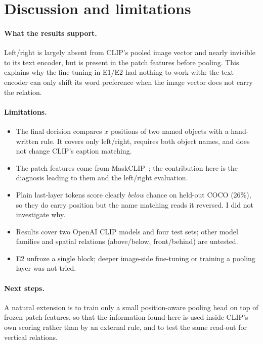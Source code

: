 \documentclass[10pt,twocolumn,letterpaper]{article}
\begin{document}
\section{Discussion and limitations}
\label{sec:limits}

\paragraph{What the results support.}
Left/right is largely absent from CLIP's pooled image vector and nearly invisible to its text encoder, but is present in the patch features before pooling.
This explains why the fine-tuning in E1/E2 had nothing to work with: the text encoder can only shift its word preference when the image vector does not carry the relation.

\paragraph{Limitations.}
\begin{itemize}
\setlength\itemsep{0pt}
\item The final decision compares $x$ positions of two named objects with a hand-written rule. It covers only left/right, requires both object names, and does not change CLIP's caption matching.
\item The patch features come from MaskCLIP~\cite{zhou2022maskclip}; the contribution here is the diagnosis leading to them and the left/right evaluation.
\item Plain last-layer tokens score clearly \emph{below} chance on held-out COCO (26\%), so they do carry position but the name matching reads it reversed. I did not investigate why.
\item Results cover two OpenAI CLIP models and four test sets; other model families and spatial relations (above/below, front/behind) are untested.
\item E2 unfroze a single block; deeper image-side fine-tuning or training a pooling layer was not tried.
\end{itemize}

\paragraph{Next steps.}
A natural extension is to train only a small position-aware pooling head on top of frozen patch features, so that the information found here is used inside CLIP's own scoring rather than by an external rule, and to test the same read-out for vertical relations.

{
\small


}
\end{document}
